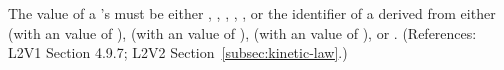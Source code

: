 The value of a \KineticLaw's  must be either
, , , ,
, or the identifier of a \UnitDefinition derived from
either  (with an  value of ),
 (with an  value of ),
 (with an  value of ), or
.  (References: L2V1 Section 4.9.7; L2V2
Section~\ref{subsec:kinetic-law}.)
